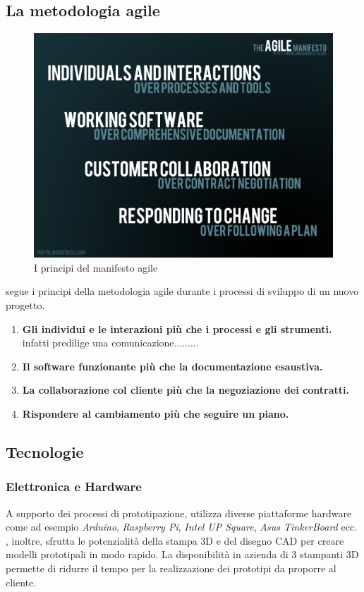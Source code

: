 \subsection{La metodologia agile}
\begin{figure}[H]
	\begin{center}
	\includegraphics[scale=0.25]{immagini/agile_manifesto.jpg}
	\caption{I principi del manifesto agile}
	\end{center}
\end{figure}
\lab{} segue i principi della metodologia agile durante i processi di sviluppo di un nuovo progetto.
\begin{enumerate}
\item \textbf{Gli individui e le interazioni più che i processi e gli strumenti.}
\tab \lab{} infatti predilige una comunicazione.........
\item \textbf{Il software funzionante più che la documentazione esaustiva.}
\item \textbf{La collaborazione col cliente più che la negoziazione dei contratti.}
\item \textbf{Rispondere al cambiamento più che seguire un piano.}
\end{enumerate}




\subsection{Tecnologie}

\subsubsection{Elettronica e Hardware}
A supporto dei processi di prototipazione, \lab{} utilizza diverse piattaforme hardware come ad esempio \textit{Arduino}, \textit{Raspberry Pi}, \textit{Intel UP Square}, \textit{Asus TinkerBoard} ecc.\\
\lab{}, inoltre, sfrutta le potenzialità della stampa 3D e del disegno CAD per creare modelli prototipali in modo rapido. La disponibilità in azienda di 3 stampanti 3D permette di ridurre il tempo per la realizzazione dei prototipi da proporre al cliente.

